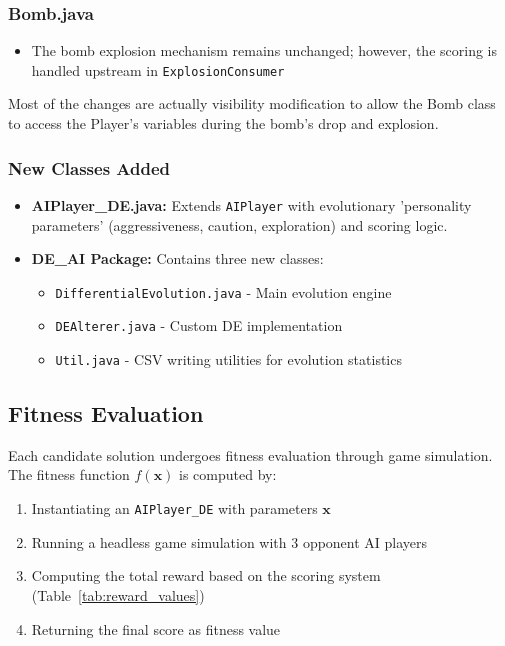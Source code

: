 \documentclass[sigconf]{acmart} %
\begin{document}
\subsubsection{\textbf{Bomb.java}}
\begin{itemize}
    \item The bomb explosion mechanism remains unchanged; however, the scoring is handled upstream in \texttt{ExplosionConsumer}\\
\end{itemize}

Most of the changes are actually visibility modification to allow the Bomb class to access the Player's variables during the bomb's drop and explosion.


\subsubsection{\textbf{New Classes Added}}
\begin{itemize}
    \item \textbf{AIPlayer\_DE.java:} Extends \texttt{AIPlayer} with evolutionary 'personality parameters' (aggressiveness, caution, exploration) and scoring logic.
    \item \textbf{DE\_AI Package:} Contains three new classes:
    \begin{itemize}
        \item \texttt{DifferentialEvolution.java} - Main evolution engine
        \item \texttt{DEAlterer.java} - Custom DE implementation
        \item \texttt{Util.java} - CSV writing utilities for evolution statistics
    \end{itemize}
\end{itemize}

\subsection{Fitness Evaluation}
Each candidate solution undergoes fitness evaluation through game simulation. 
The fitness function $f(\mathbf{x})$ is computed by:\\

\begin{enumerate}
    \item Instantiating an \texttt{AIPlayer\_DE} with parameters $\mathbf{x}$
    \item Running a headless game simulation with 3 opponent AI players
    \item Computing the total reward based on the scoring system (Table~\ref{tab:reward_values})
    \item Returning the final score as fitness value
\end{enumerate}
\end{document}
